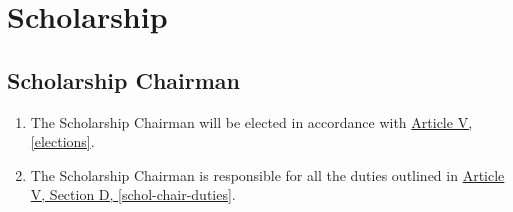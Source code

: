 \chapter{Scholarship}


\section{Scholarship Chairman}
	\begin{enumerate}
		\item The Scholarship Chairman will be elected in accordance with \hyperref[elections]{Article V, \autoref*{elections}}.

		\item The Scholarship Chairman is responsible for all the duties outlined in \hyperref[schol-chair-duties]{Article V, Section D, \autoref*{schol-chair-duties}}.

	\end{enumerate}


